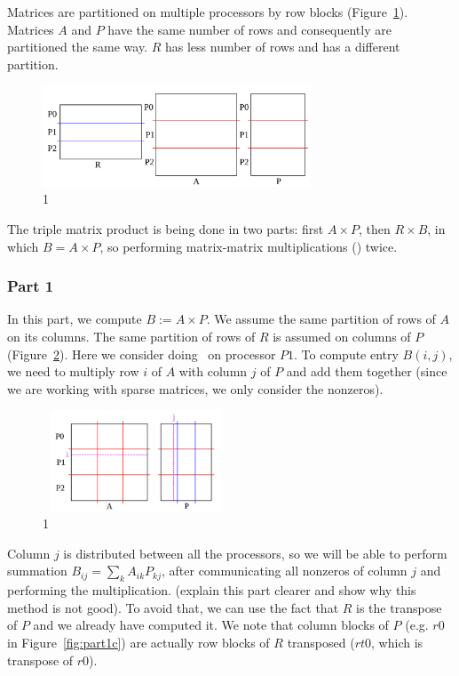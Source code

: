 Matrices are partitioned on multiple processors by row blocks (Figure~\ref{fig:partition}). Matrices $A$ and $P$ have the same number of rows and consequently are partitioned the same way. $R$ has less number of rows and has a different partition.

\begin{figure}[tbh]
 \centering
 \includegraphics[width=8cm,height=3cm]{./figures/partition.pdf}
 \caption{1}
 \label{fig:partition}
\end{figure}

The triple matrix product is being done in two parts: first $A \times P$, then $R \times B$, in which $B = A \times P$, so performing matrix-matrix multiplications (\mm) twice.

\subsubsection{Part 1}

In this part, we compute $B := A \times P$. We assume the same partition of rows of $A$ on its columns. The same partition of rows of $R$ is assumed on columns of $P$ (Figure~\ref{fig:part1b}).
Here we consider doing \mm ~on processor $P1$. To compute entry $B(i, j)$, we need to multiply row $i$ of $A$ with column $j$ of $P$ and add them together (since we are working with sparse matrices, we only consider the nonzeros).

\begin{figure}[tbh]
 \centering
 \includegraphics[width=5.5cm,height=3cm]{./figures/part1b.pdf}
 \caption{1}
 \label{fig:part1b}
\end{figure}

Column $j$ is distributed between all the processors, so we will be able to perform  summation $B_{ij} = \sum_{k} A_{ik} P_{kj}$, after communicating all nonzeros of column $j$ and performing the multiplication. (explain this part clearer and show why this method is not good). To avoid that, we can use the fact that $R$ is the transpose of $P$ and we already have computed it. We note that column blocks of $P$ (e.g. $r0$ in Figure~\ref{fig:part1c}) are actually row blocks of $R$ transposed ($rt0$, which is transpose of $r0$).

